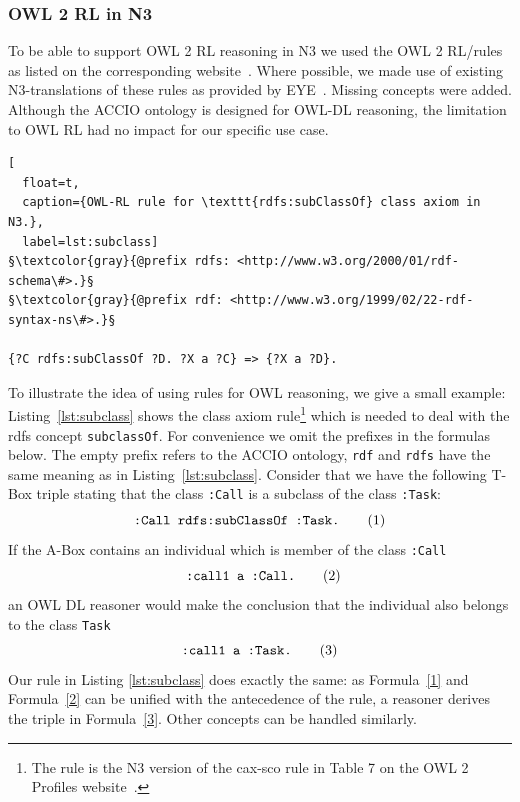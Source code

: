 \subsubsection{OWL 2 RL in N3}
To be able to support OWL 2 RL reasoning in N3 we used the OWL 2 RL/\rdf rules as listed on the corresponding website~\cite{OWLRL}. 
Where possible, we made use of existing N3-translations of these rules as provided by EYE~\cite{EYEowl}. 
Missing concepts were added. Although the ACCIO ontology is designed for OWL-DL reasoning, the limitation to OWL RL had no impact for 
our specific use case. %


\begin{lstlisting}[
  float=t,
  caption={OWL-RL rule for \texttt{rdfs:subClassOf} class axiom in N3.},
  label=lst:subclass]
§\textcolor{gray}{@prefix rdfs: <http://www.w3.org/2000/01/rdf-schema\#>.}§
§\textcolor{gray}{@prefix rdf: <http://www.w3.org/1999/02/22-rdf-syntax-ns\#>.}§

{?C rdfs:subClassOf ?D. ?X a ?C} => {?X a ?D}.
\end{lstlisting}
To illustrate the idea of using rules for OWL reasoning, we give a small example: Listing~\ref{lst:subclass} shows 
the class axiom rule\footnote{The rule is the N3 version of the cax-sco rule in Table 7 on the OWL 2 Profiles website~\cite{OWLRL}.} which is needed 
to deal with the rdfs concept
 \verb!subclassOf!. For convenience we omit the prefixes in the formulas below. The empty prefix refers to the ACCIO ontology, 
 \verb!rdf! and \verb!rdfs! have the same meaning as in Listing~\ref{lst:subclass}. Consider that we have the following T-Box triple stating that the class \verb!:Call!
 is 
 a subclass of the class \verb!:Task!:
\[
 \verb!:Call rdfs:subClassOf :Task.! \tag{1}\label{1}
\]
If the A-Box contains an individual which is member of the class \verb!:Call!
\[\verb! :call1 a :Call.! \tag{2}\label{2}\]
an OWL DL reasoner would make the conclusion that the individual also belongs to the class \verb!Task! 
\[
 \verb!:call1 a :Task.! \tag{3}\label{3}
\]
Our rule in Listing \ref{lst:subclass} does exactly the same: as Formula~\ref{1} and Formula~\ref{2} can be unified with the antecedence of the rule, a reasoner derives
the triple in Formula~\ref{3}. Other concepts can be handled similarly.







